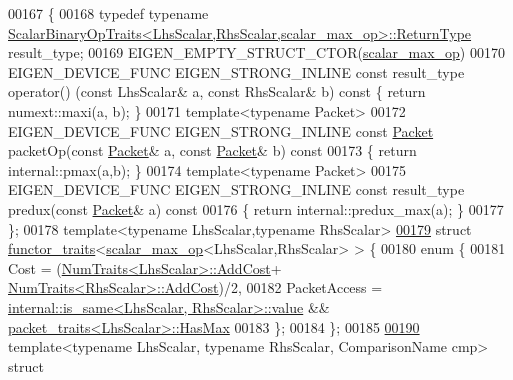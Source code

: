\begin{DoxyCode}
00167 \{
00168   \textcolor{keyword}{typedef} \textcolor{keyword}{typename} 
      \hyperlink{group___core___module_struct_eigen_1_1_scalar_binary_op_traits}{ScalarBinaryOpTraits<LhsScalar,RhsScalar,scalar\_max\_op>::ReturnType}
       result\_type;
00169   EIGEN\_EMPTY\_STRUCT\_CTOR(\hyperlink{struct_eigen_1_1internal_1_1scalar__max__op}{scalar\_max\_op})
00170   EIGEN\_DEVICE\_FUNC EIGEN\_STRONG\_INLINE \textcolor{keyword}{const} result\_type operator() (\textcolor{keyword}{const} LhsScalar& a, \textcolor{keyword}{const} RhsScalar& 
      b)\textcolor{keyword}{ const }\{ \textcolor{keywordflow}{return} numext::maxi(a, b); \}
00171   \textcolor{keyword}{template}<\textcolor{keyword}{typename} Packet>
00172   EIGEN\_DEVICE\_FUNC EIGEN\_STRONG\_INLINE \textcolor{keyword}{const} \hyperlink{union_eigen_1_1internal_1_1_packet}{Packet} packetOp(\textcolor{keyword}{const} \hyperlink{union_eigen_1_1internal_1_1_packet}{Packet}& a, \textcolor{keyword}{const} 
      \hyperlink{union_eigen_1_1internal_1_1_packet}{Packet}& b)\textcolor{keyword}{ const}
00173 \textcolor{keyword}{  }\{ \textcolor{keywordflow}{return} internal::pmax(a,b); \}
00174   \textcolor{keyword}{template}<\textcolor{keyword}{typename} Packet>
00175   EIGEN\_DEVICE\_FUNC EIGEN\_STRONG\_INLINE \textcolor{keyword}{const} result\_type predux(\textcolor{keyword}{const} \hyperlink{union_eigen_1_1internal_1_1_packet}{Packet}& a)\textcolor{keyword}{ const}
00176 \textcolor{keyword}{  }\{ \textcolor{keywordflow}{return} internal::predux\_max(a); \}
00177 \};
00178 \textcolor{keyword}{template}<\textcolor{keyword}{typename} LhsScalar,\textcolor{keyword}{typename} RhsScalar>
\hyperlink{struct_eigen_1_1internal_1_1functor__traits_3_01scalar__max__op_3_01_lhs_scalar_00_01_rhs_scalar_01_4_01_4}{00179} \textcolor{keyword}{struct }\hyperlink{struct_eigen_1_1internal_1_1functor__traits}{functor\_traits}<\hyperlink{struct_eigen_1_1internal_1_1scalar__max__op}{scalar\_max\_op}<LhsScalar,RhsScalar> > \{
00180   \textcolor{keyword}{enum} \{
00181     Cost = (\hyperlink{group___core___module_struct_eigen_1_1_num_traits}{NumTraits<LhsScalar>::AddCost}+
      \hyperlink{group___core___module_struct_eigen_1_1_num_traits}{NumTraits<RhsScalar>::AddCost})/2,
00182     PacketAccess = \hyperlink{struct_eigen_1_1internal_1_1is__same}{internal::is\_same<LhsScalar, RhsScalar>::value}
       && \hyperlink{struct_eigen_1_1internal_1_1packet__traits}{packet\_traits<LhsScalar>::HasMax}
00183   \};
00184 \};
00185 
\hyperlink{struct_eigen_1_1internal_1_1scalar__cmp__op}{00190} \textcolor{keyword}{template}<\textcolor{keyword}{typename} LhsScalar, \textcolor{keyword}{typename} RhsScalar, ComparisonName cmp> \textcolor{keyword}{struct }

\end{DoxyCode}
